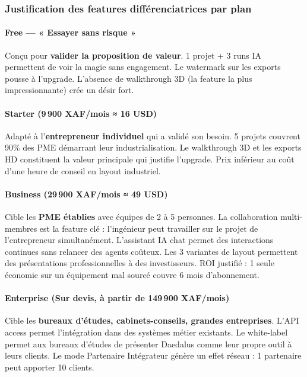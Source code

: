 \documentclass[12pt,a4paper]{article}
\begin{document}
\subsubsection{Justification des features différenciatrices par plan}

\paragraph{Free — « Essayer sans risque »}
Conçu pour \textbf{valider la proposition de valeur}. 1 projet + 3 runs IA permettent de voir la magie sans engagement. Le watermark sur les exports pousse à l'upgrade. L'absence de walkthrough 3D (la feature la plus impressionnante) crée un désir fort.

\paragraph{Starter (9\,900 XAF/mois ≈ 16 USD)}
Adapté à l'\textbf{entrepreneur individuel} qui a validé son besoin. 5 projets couvrent 90\% des PME démarrant leur industrialisation. Le walkthrough 3D et les exports HD constituent la valeur principale qui justifie l'upgrade. Prix inférieur au coût d'une heure de conseil en layout industriel.

\paragraph{Business (29\,900 XAF/mois ≈ 49 USD)}
Cible les \textbf{PME établies} avec équipes de 2 à 5 personnes. La collaboration multi-membres est la feature clé : l'ingénieur peut travailler sur le projet de l'entrepreneur simultanément. L'assistant IA chat permet des interactions continues sans relancer des agents coûteux. Les 3 variantes de layout permettent des présentations professionnelles à des investisseurs. ROI justifié : 1 seule économie sur un équipement mal sourcé couvre 6 mois d'abonnement.

\paragraph{Enterprise (Sur devis, à partir de 149\,900 XAF/mois)}
Cible les \textbf{bureaux d'études, cabinets-conseils, grandes entreprises}. L'API access permet l'intégration dans des systèmes métier existants. Le white-label permet aux bureaux d'études de présenter Daedalus comme leur propre outil à leurs clients. Le mode Partenaire Intégrateur génère un effet réseau : 1 partenaire peut apporter 10 clients.
\end{document}
